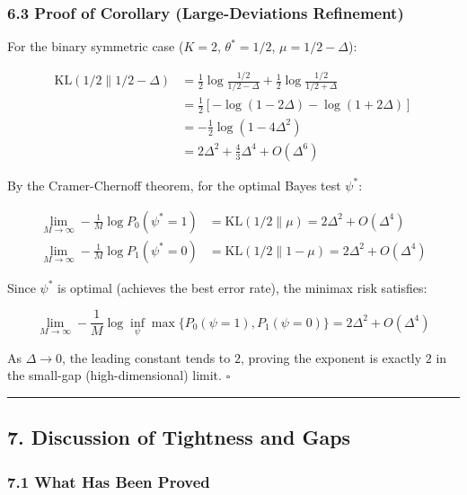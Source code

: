 \documentclass[
  12pt,
]{article}
\begin{document}
\subsubsection{6.3 Proof of Corollary (Large-Deviations
Refinement)}\label{proof-of-corollary-large-deviations-refinement}

For the binary symmetric case (\(K=2\), \(\theta^* = 1/2\),
\(\mu = 1/2 - \Delta\)):

\[\begin{aligned}
\text{KL}(1/2 \parallel 1/2 - \Delta) &= \frac{1}{2}\log\frac{1/2}{1/2-\Delta} + \frac{1}{2}\log\frac{1/2}{1/2+\Delta} \\
&= \frac{1}{2}\left[-\log(1-2\Delta) - \log(1+2\Delta)\right] \\
&= -\frac{1}{2}\log(1 - 4\Delta^2) \\
&= 2\Delta^2 + \frac{4}{3}\Delta^4 + O(\Delta^6)
\end{aligned}\]

By the Cramer-Chernoff theorem, for the optimal Bayes test \(\psi^*\):

\[\begin{aligned}
\lim_{M \to \infty} -\frac{1}{M}\log P_0(\psi^*=1) &= \text{KL}(1/2 \parallel \mu) = 2\Delta^2 + O(\Delta^4) \\
\lim_{M \to \infty} -\frac{1}{M}\log P_1(\psi^*=0) &= \text{KL}(1/2 \parallel 1-\mu) = 2\Delta^2 + O(\Delta^4)
\end{aligned}\]

Since \(\psi^*\) is optimal (achieves the best error rate), the minimax
risk satisfies:

\[\lim_{M \to \infty} -\frac{1}{M}\log \inf_{\psi} \max\{P_0(\psi=1), P_1(\psi=0)\} = 2\Delta^2 + O(\Delta^4)\]

As \(\Delta \to 0\), the leading constant tends to \(2\), proving the
exponent is exactly \(2\) in the small-gap (high-dimensional) limit.
\(\square\)

\begin{center}\rule{0.5\linewidth}{0.5pt}\end{center}

\subsection{7. Discussion of Tightness and
Gaps}\label{discussion-of-tightness-and-gaps}

\subsubsection{7.1 What Has Been Proved}\label{what-has-been-proved}
\end{document}
